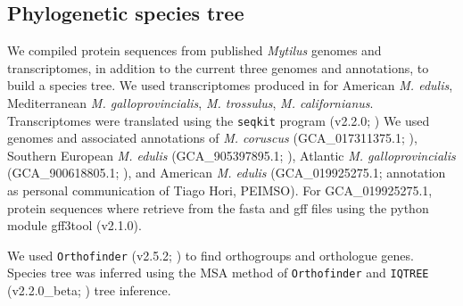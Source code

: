 \documentclass[11pt, a4paper]{article}
\begin{document}
\subsection{Phylogenetic species tree}

We compiled protein sequences from published \textit{Mytilus} genomes and transcriptomes,
in addition to the current three genomes and annotations, to build a species tree.
We used transcriptomes produced in \textcite{Popovic2020a} for American \textit{M. edulis}, 
Mediterranean \textit{M. galloprovincialis}, \textit{M. trossulus}, \textit{M. californianus}.
Transcriptomes were translated using the \texttt{seqkit} program (v2.2.0; \cite{Shen2016})
We used genomes and associated annotations of \textit{M. coruscus} (GCA\_017311375.1; \textcite{Yang2021}),
Southern European \textit{M. edulis} (GCA\_905397895.1; \textcite{Corrochano-Fraile2021}),
Atlantic \textit{M. galloprovincialis} (GCA\_900618805.1; \textcite{Gerdol2020}),
and American \textit{M. edulis} (GCA\_019925275.1; annotation as personal communication of Tiago Hori, PEIMSO).
For GCA\_019925275.1, protein sequences where retrieve from the fasta and gff files using the python module gff3tool (v2.1.0).

We used \texttt{Orthofinder} (v2.5.2; \cite{Emms2015, Emms2019}) to find orthogroups and orthologue genes.
Species tree was inferred using the MSA method of \texttt{Orthofinder} \parencite{Emms2018} and \texttt{IQTREE} (v2.2.0\_beta; \cite{Minh2020}) tree inference.
\end{document}
